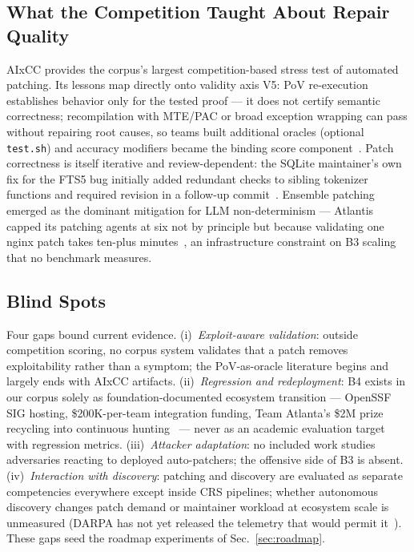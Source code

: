 \subsection{What the Competition Taught About Repair Quality}
AIxCC provides the corpus's largest competition-based stress test of automated patching. Its lessons
map directly onto validity axis V5: PoV re-execution establishes behavior only for the tested proof --- it does not certify semantic correctness;
recompilation with MTE/PAC or broad exception wrapping can pass without repairing root causes,
so teams built additional oracles (optional \texttt{test.sh}) and accuracy modifiers became the
binding score component~\cite{taafc2025}. Patch correctness is itself iterative and review-dependent:
the SQLite maintainer's own fix for the FTS5 bug initially added redundant checks to sibling
tokenizer functions and required revision in a follow-up commit~\cite{taasc2024}. Ensemble
patching emerged as the dominant mitigation for LLM non-determinism --- Atlantis capped its
patching agents at six not by principle but because validating one nginx patch takes ten-plus
minutes~\cite{taafc2025}, an infrastructure constraint on B3 scaling that no benchmark measures.

\subsection{Blind Spots}
Four gaps bound current evidence. (i)~\emph{Exploit-aware validation}: outside competition
scoring, no corpus system validates that a patch removes exploitability rather than a symptom;
the PoV-as-oracle literature begins and largely ends with AIxCC artifacts. (ii)~\emph{Regression
and redeployment}: B4 exists in our corpus solely as foundation-documented ecosystem transition
--- OpenSSF SIG hosting, \$200K-per-team integration funding, Team Atlanta's \$2M prize
recycling into continuous hunting~\cite{openssfaixcc2026,tobbuttercup2025,taafc2025} --- never
as an academic evaluation target with regression metrics. (iii)~\emph{Attacker adaptation}: no
included work studies adversaries reacting to deployed auto-patchers; the offensive side of B3
is absent. (iv)~\emph{Interaction with discovery}: patching and discovery are evaluated as
separate competencies everywhere except inside CRS pipelines; whether autonomous discovery
changes patch demand or maintainer workload at ecosystem scale is unmeasured (DARPA has not yet
released the telemetry that would permit it~\cite{tobbuttercup2025}). These gaps seed the
roadmap experiments of Sec.~\ref{sec:roadmap}.
